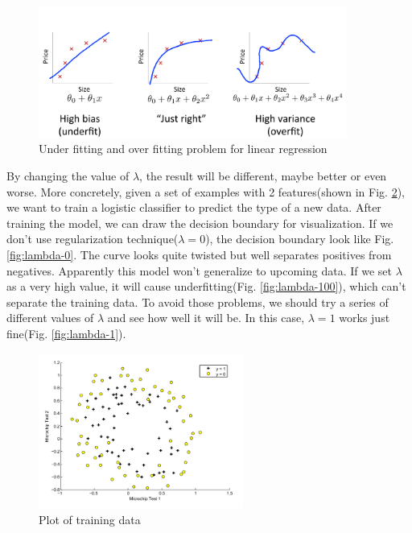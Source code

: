 \documentclass{article} %
\begin{document}
\begin{figure}[h]
  \centering
  \includegraphics[width=0.9\textwidth]{under-and-over-fit.png}
  \caption{Under fitting and over fitting problem for linear regression}
  \label{fig:overfit}
\end{figure}

By changing the value of $\lambda$, the result will be different, maybe better or even worse. More concretely, given a set of examples with 2 features(shown in Fig. \ref{fig:training-data}), we want to train a logistic classifier to predict the type of a new data. After training the model, we can draw the decision boundary for visualization. If we don't use regularization technique($\lambda=0$), the decision boundary look like Fig. \ref{fig:lambda-0}. The curve looks quite twisted but well separates positives from negatives. Apparently this model won't generalize to upcoming data. If we set $\lambda$ as a very high value, it will cause underfitting(Fig. \ref{fig:lambda-100}), which can't separate the training data. To avoid those problems, we should try a series of different values of $\lambda$ and see how well it will be. In this case, $\lambda=1$ works just fine(Fig. \ref{fig:lambda-1}).

\begin{figure}[h]
  \centering
  \includegraphics[width=0.6\textwidth]{training-data.png}
  \caption{Plot of training data}
  \label{fig:training-data}
\end{figure}
\end{document}
